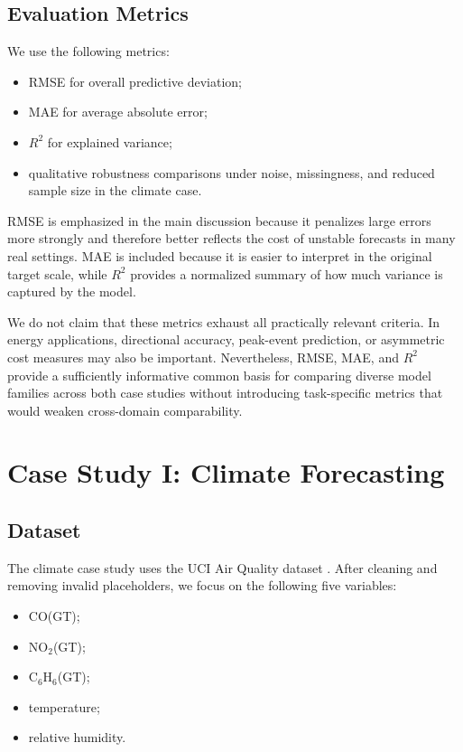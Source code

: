 \documentclass[10pt,conference,onecolumn]{IEEEtran}
\begin{document}
\subsection{Evaluation Metrics}

We use the following metrics:
\begin{itemize}
    \item RMSE for overall predictive deviation;
    \item MAE for average absolute error;
    \item $R^2$ for explained variance;
    \item qualitative robustness comparisons under noise, missingness, and reduced sample size in the climate case.
\end{itemize}

RMSE is emphasized in the main discussion because it penalizes large errors more strongly and therefore better reflects the cost of unstable forecasts in many real settings. MAE is included because it is easier to interpret in the original target scale, while $R^2$ provides a normalized summary of how much variance is captured by the model.

We do not claim that these metrics exhaust all practically relevant criteria. In energy applications, directional accuracy, peak-event prediction, or asymmetric cost measures may also be important. Nevertheless, RMSE, MAE, and $R^2$ provide a sufficiently informative common basis for comparing diverse model families across both case studies without introducing task-specific metrics that would weaken cross-domain comparability.

\section{Case Study I: Climate Forecasting}

\subsection{Dataset}

The climate case study uses the UCI Air Quality dataset \cite{devito2008airquality}. After cleaning and removing invalid placeholders, we focus on the following five variables:
\begin{itemize}
    \item CO(GT);
    \item NO$_2$(GT);
    \item C$_6$H$_6$(GT);
    \item temperature;
    \item relative humidity.
\end{itemize}
\end{document}
